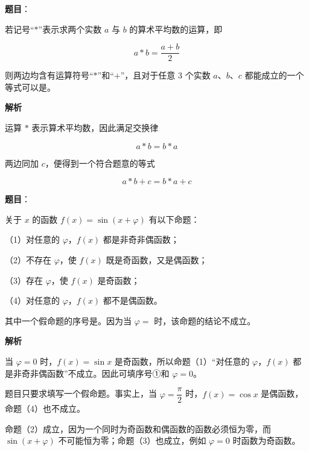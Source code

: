 \begin{answer}

\textbf{题目}：

若记号“$\ast$”表示求两个实数 $a$ 与 $b$ 的算术平均数的运算，即

\nopagebreak[4]
\[
a\ast b=\dfrac{a+b}{2}
\]

则两边均含有运算符号“$\ast$”和“$+$”，且对于任意 $3$ 个实数 $a\text{、}b\text{、}c$ 都能成立的一个等式可以是\gkblank{}。

\textbf{解析}

运算 $\ast$ 表示算术平均数，因此满足交换律

\nopagebreak[4]
\[
a\ast b=b\ast a
\]

两边同加 $c$，便得到一个符合题意的等式

\nopagebreak[4]
\[
a\ast b+c=b\ast a+c
\]


\end{answer}
\begin{answer}

\textbf{题目}：

关于 $x$ 的函数 $f(x)=\sin(x+\varphi)$ 有以下命题：

（1）对任意的 $\varphi$，$f(x)$ 都是非奇非偶函数；

（2）不存在 $\varphi$，使 $f(x)$ 既是奇函数，又是偶函数；

（3）存在 $\varphi$，使 $f(x)$ 是奇函数；

（4）对任意的 $\varphi$，$f(x)$ 都不是偶函数。

其中一个假命题的序号是\gkblank{}。因为当 $\varphi=$\gkblank{} 时，该命题的结论不成立。

\textbf{解析}

当 $\varphi=0$ 时，$f(x)=\sin x$ 是奇函数，所以命题（1）“对任意的 $\varphi$，$f(x)$ 都是非奇非偶函数”不成立。因此可填序号①和 $\varphi=0$。

题目只要求填写一个假命题。事实上，当 $\varphi=\dfrac\pi2$ 时，$f(x)=\cos x$ 是偶函数，命题（4）也不成立。

命题（2）成立，因为一个同时为奇函数和偶函数的函数必须恒为零，而 $\sin(x+\varphi)$ 不可能恒为零；命题（3）也成立，例如 $\varphi=0$ 时函数为奇函数。


\end{answer}
